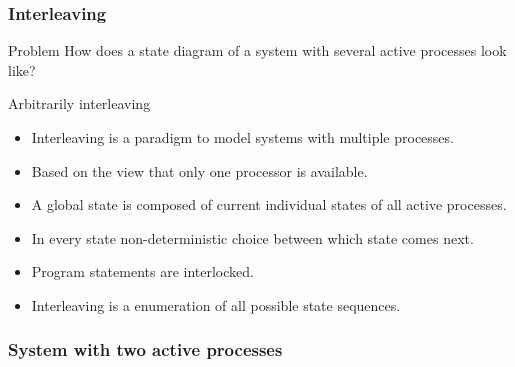 \documentclass{beamer}
\begin{document}
\begin{frame}
  \frametitle{Interleaving}
  \begin{block}{Problem}
How does a state diagram of a system with several active processes look like?      \end{block}
\begin{block}{Arbitrarily interleaving}
  
\end{block}
  \begin{itemize}
  \item Interleaving is a paradigm to model systems with multiple processes.
  \item Based on the view that only one processor is available.
  \item A global state is composed of current individual states of all active processes.
  \item In every state non-deterministic choice between which state comes next.
  \item Program statements are interlocked.
  \item Interleaving is a enumeration of all possible state sequences.
  \end{itemize}
\end{frame}

\begin{frame}[fragile]
  \frametitle{System with two active processes}
  
\end{frame}
\end{document}
